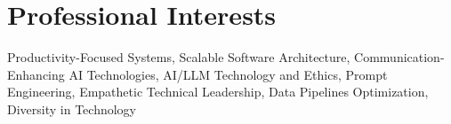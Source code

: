 
\section{Professional Interests}
\footnotesize{Productivity-Focused Systems, Scalable Software Architecture, Communication-Enhancing AI Technologies, AI/LLM Technology and Ethics, Prompt Engineering, Empathetic Technical Leadership, Data Pipelines Optimization, Diversity in Technology}